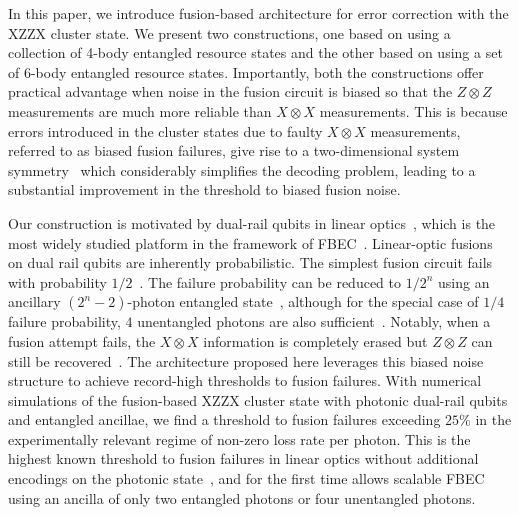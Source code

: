 \documentclass[reprint,
groupedaddress,
 prl,amsmath,amssymb,
 aps]{revtex4-2}
\theoremstyle{definition}
\begin{document}
\begin{bibunit}
In this paper, we introduce fusion-based architecture for error correction with the XZZX cluster state. We present two constructions, one based on using a collection of 4-body entangled resource states and the other based on using a set of 6-body entangled resource states. Importantly, both the constructions offer practical advantage when noise in the fusion circuit is biased so that the $Z\otimes Z$ measurements are much more reliable than $X\otimes X$ measurements. This is because errors introduced in the cluster states due to faulty $X\otimes X$ measurements, referred to as biased fusion failures, give rise to a two-dimensional system symmetry~\cite{brown2022conservation} which considerably simplifies the decoding problem, leading to a substantial improvement in the threshold to biased fusion noise.

Our construction is motivated by dual-rail qubits in linear optics~\cite{nielsen2004optical,nielsen2005fault,gilchrist2007efficient,kok2007linear}, which is the most widely studied platform in the framework of FBEC~\cite{browne2005resource,li2015resource,bartolucci2021fusion}. Linear-optic fusions on dual rail qubits are inherently probabilistic. The simplest fusion circuit fails with probability $1/2$~\cite{browne2005resource}. 
The failure probability can be reduced to $1/2^n$ using an ancillary $(2^n-2)$-photon entangled state~\cite{grice2011arbitrarily}, although for the special case of {$1/4$ failure probability}, $4$ unentangled photons are {also} sufficient~\cite{ewert20143}. Notably, when a fusion attempt fails, the $X\otimes X$ information is completely erased but $Z\otimes Z$ can still be recovered~\cite{browne2005resource,bartolucci2021fusion}. The architecture proposed here leverages this biased noise structure to achieve record-high thresholds to fusion failures. With numerical simulations of the fusion-based XZZX cluster state with photonic dual-rail qubits and entangled ancillae, we find a threshold to fusion failures exceeding $25\%$ in the experimentally relevant regime of non-zero loss rate per photon. This is the highest known threshold to fusion failures in linear optics without additional encodings on the photonic state{{~\cite{li2010fault,auger2018fault,bartolucci2021fusion,paesani2022high}}}, and for the first time allows scalable FBEC using an ancilla of only two entangled photons or four unentangled photons.





\end{bibunit}
\end{document}
